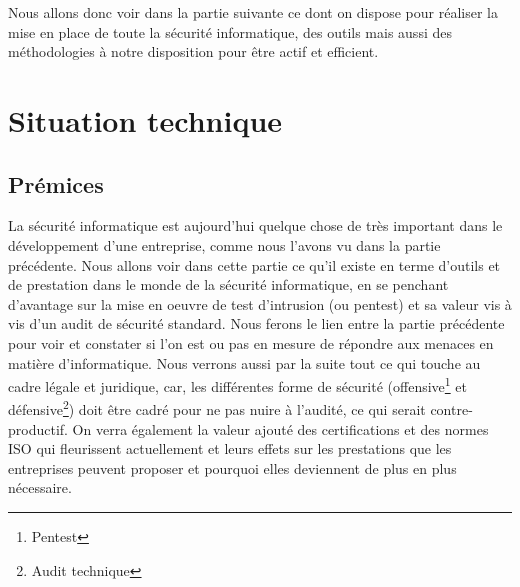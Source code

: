\documentclass[a4paper]{memoir}
\begin{document}
Nous allons donc voir dans la partie suivante ce dont on dispose pour réaliser la mise en place de toute la sécurité informatique, des outils mais aussi des méthodologies à notre disposition pour être actif et efficient.

\part{Situation technique}

\chapter{Prémices}

La sécurité informatique est aujourd'hui quelque chose de très important dans le développement d'une entreprise, comme nous l'avons vu dans la partie précédente. Nous allons voir dans cette partie ce qu'il existe en terme d'outils et de prestation dans le monde de la sécurité informatique, en se penchant d'avantage sur la mise en oeuvre de test d'intrusion (ou pentest) et sa valeur vis à vis d'un audit de sécurité standard. Nous ferons le lien entre la partie précédente pour voir et constater si l'on est ou pas en mesure de répondre aux menaces en matière d'informatique. Nous verrons aussi par la suite tout ce qui touche au cadre légale et juridique, car, les différentes forme de sécurité (offensive\footnote{Pentest} et défensive\footnote{Audit technique}) doit être cadré pour ne pas nuire à l'audité, ce qui serait contre-productif. On verra également la valeur ajouté des certifications et des normes ISO qui fleurissent actuellement et leurs effets sur les prestations que les entreprises peuvent proposer et pourquoi elles deviennent de plus en plus nécessaire.\\ 
\end{document}
